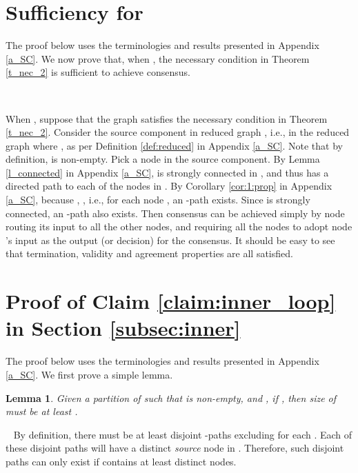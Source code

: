 \documentclass[letterpaper, 11pt]{article}
\newenvironment{proof}{\noindent {\bf Proof:}~}{\hspace*{\fill}}
\newtheorem{lemma}{Lemma}
\begin{document}
\section{Sufficiency for }
\label{a_f_0}

The proof below uses the terminologies and results presented in Appendix \ref{a_SC}.
We now prove that, when , the necessary condition in Theorem \ref{t_nec_2} is
sufficient to achieve consensus.

\begin{proof}

When ,
suppose that the graph  satisfies the necessary condition in Theorem \ref{t_nec_2}.
Consider the source component  in reduced graph , i.e., in the reduced graph where , as per Definition \ref{def:reduced} in Appendix \ref{a_SC}. Note that by definition,  is non-empty. Pick a node  in the source component. By Lemma \ref{l_connected} in Appendix \ref{a_SC},  is strongly connected in , and thus  has a directed path to each of the nodes in . By Corollary \ref{cor:1:prop} in Appendix \ref{a_SC}, because , , i.e., for each node , an -path exists. Since  is strongly connected, an -path also exists.  Then consensus can be achieved simply by node  routing its input to all the other nodes, and requiring all the nodes to adopt node 's input as the output (or decision) for the consensus.  It should be easy to see that termination, validity and agreement properties are all satisfied.

\end{proof}

























\section{Proof of Claim \ref{claim:inner_loop} in Section \ref{subsec:inner}}
\label{a_claim:S}

The proof below uses the terminologies and results presented in Appendix \ref{a_SC}. We first prove a simple lemma.


\begin{lemma}
\label{l_propagate_f+1}
Given a partition  of  such that  is non-empty,
and ,
if , then
size of  must be at least .
\end{lemma}
\begin{proof}
By definition, there must be at least  disjoint -paths
excluding  for each . Each of these  disjoint paths
will have a distinct {\em source} node in . Therefore, such  disjoint paths
can only exist if  contains at least  distinct nodes.
\end{proof}
\end{document}

